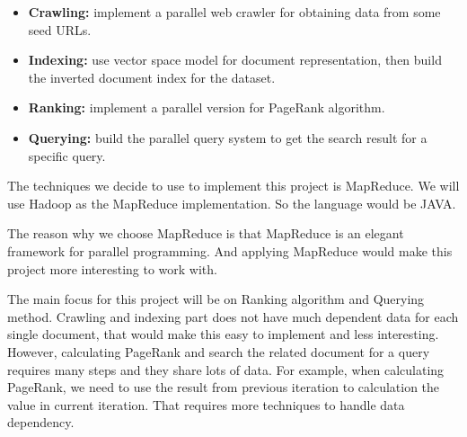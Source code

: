 \documentclass[11pt]{amsart}
\begin{document}
\begin{itemize}
	\item {\bf Crawling:} implement a parallel web crawler for obtaining data from some seed URLs.
	\item {\bf Indexing:} use vector space model for document representation, then build the inverted
	document index for the dataset. 
	\item {\bf Ranking:} implement a parallel version for PageRank algorithm.
	\item {\bf Querying:} build the parallel query system to get the search result for a specific query.
\end{itemize}

The techniques we decide to use to implement this project is MapReduce. We will use Hadoop as the MapReduce
implementation. So the language would be JAVA.

The reason why we choose MapReduce is that MapReduce is an elegant framework for parallel programming. And
applying MapReduce would make this project more interesting to work with. 

The main focus for this project will be on Ranking algorithm and Querying method. Crawling and indexing part
does not have much dependent data for each single document, that would make this easy to implement and less
interesting. However, calculating PageRank and search the related document for a query requires many steps
and they share lots of data. For example, when calculating PageRank, we need to use the result from previous
iteration to calculation the value in current iteration. That requires more techniques to handle data 
dependency.
\end{document}
